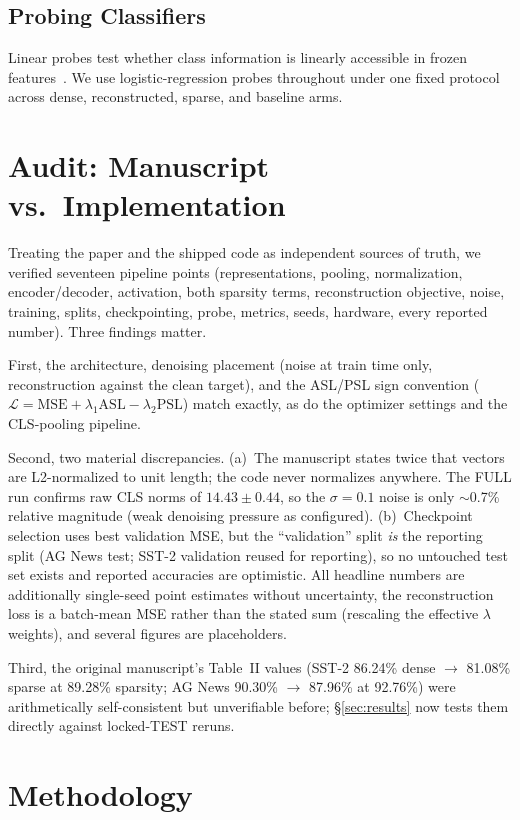 \documentclass[conference]{IEEEtran}
\begin{document}
\subsection{Probing Classifiers}
Linear probes test whether class information is linearly accessible in
frozen features~\cite{tenney2019bert}. We use logistic-regression probes
throughout under one fixed protocol across dense, reconstructed, sparse,
and baseline arms.

\section{Audit: Manuscript vs.\ Implementation}
Treating the paper and the shipped code as independent sources of truth, we
verified seventeen pipeline points (representations, pooling,
normalization, encoder/decoder, activation, both sparsity terms,
reconstruction objective, noise, training, splits, checkpointing, probe,
metrics, seeds, hardware, every reported number). Three findings matter.

First, the architecture, denoising placement (noise at train time only,
reconstruction against the clean target), and the ASL/PSL sign convention
($\mathcal{L}=\mathrm{MSE}+\lambda_1\mathrm{ASL}-\lambda_2\mathrm{PSL}$)
match exactly, as do the optimizer settings and the CLS-pooling pipeline.

Second, two material discrepancies. (a)~The manuscript states twice that
vectors are L2-normalized to unit length; the code never normalizes
anywhere. The FULL run confirms raw CLS norms of $14.43\pm0.44$, so the
$\sigma=0.1$ noise is only $\sim$0.7\% relative magnitude (weak denoising
pressure as configured). (b)~Checkpoint selection uses best validation MSE,
but the ``validation'' split \emph{is} the reporting split (AG News test;
SST-2 validation reused for reporting), so no untouched test set exists and
reported accuracies are optimistic. All headline numbers are additionally
single-seed point estimates without uncertainty, the reconstruction loss is
a batch-mean MSE rather than the stated sum (rescaling the effective
$\lambda$ weights), and several figures are placeholders.

Third, the original manuscript's Table~II values (SST-2 86.24\% dense
$\rightarrow$ 81.08\% sparse at 89.28\% sparsity; AG News 90.30\%
$\rightarrow$ 87.96\% at 92.76\%) were arithmetically self-consistent but
unverifiable before; \S\ref{sec:results} now tests them directly against
locked-TEST reruns.

\section{Methodology}
\end{document}
